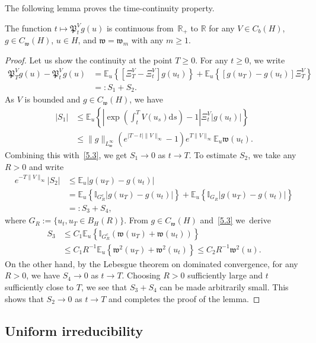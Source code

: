\documentclass[AHL,Unicode,longabstracts]{cedram}
\newcommand{\R}{{\mathbb R}}
\newcommand{\I}{{\mathbb I}}
\newcommand{\E}{{\mathbb E}}
\newcommand{\ty}{\infty}
\newcommand{\wwww}{{\mathfrak w}}
\newcommand{\PPPP}{{\mathfrak P}}
\newcommand{\dd}{\mathrm{d}}
\begin{document}
The following lemma proves the time-continuity property.

\begin{lemm}
The function $t\mapsto\PPPP^V_tg(u) $ is continuous from~$\R_+$ to $\R$ for any $V\in C_b(H)$, $ g\in C_\wwww(H) $, $u\in H$, and $\wwww=\wwww_m$ with any $m\ge1$.
\end{lemm}

\begin{proof}
Let us show the continuity at the point $T\ge0$.
For any $t\ge0$, we write
\begin{align*}
\PPPP^V_Tg(u)-\PPPP^V_tg(u)&=\E_u \left\{\left[\Xi^V_T-\Xi^V_t \right] g(u_t)\right\}+ \E_u\left\{\left[g(u_T)- g(u_t) \right] \Xi^V_T\right\}\nonumber\\&=: S_1+S_2.
\end{align*}
As $V$ is bounded and $ g\in C_\wwww(H) $, we have
\begin{align*}
|S_1|&\le \E_u \left\{\left|\exp\left(\int_t^TV(u_s)\dd s\right)- 1 \right| \Xi^V_t|g(u_t)|\right\}\nonumber\\&\le \|g\|_{L^\ty_\wwww} \left(e^{|T-t|\|V\|_\infty}-1\right)e^{T\|V\|_\infty} \E_u \wwww(u_t).
\end{align*}
Combining this with~\eqref{5.3}, we get $S_1\to0$ as $t\to T$. To estimate $S_2$, we take any~$R>0$ and write
\begin{align*}
e^{-T\|V\|_\infty} | S_2|&\le \E_u \left| g(u_T)- g(u_t) \right| \\&= \E_u \left\{\I_{G_R^c} \left| g(u_T)- g(u_t) \right| \right\}+ \E_u \left\{\I_{G_R} \left| g(u_T)- g(u_t) \right| \right\}\\&=: S_3+S_4,
\end{align*}
where $G_R:=\{u_t, u_T\in B_H(R)\}$. From $ g\in C_\wwww(H) $ and~\eqref{5.3} we~derive
\begin{align*}
S_3 &\le C_1 \E_u \left\{\I_{G_R^c} (\wwww(u_T)+ \wwww(u_t)) \right\} \\&\le C_1 R^{-1} \E_u \left\{ \wwww^2(u_T)+ \wwww^2(u_t) \right\} \le C_2 R^{-1} \wwww^2(u).
\end{align*}
On the other hand, by the Lebesgue theorem on dominated convergence, for any $R>0$, we have $S_4 \to 0$ as $t\to T$. Choosing $R>0$ sufficiently large and $t$ sufficiently close to $T$, we see that $S_3+S_4$ can be made arbitrarily small. This shows that $S_2\to0$ as $t\to T$ and completes the proof of the lemma.
\end{proof}

\subsection{Uniform irreducibility}\label{S:2.3}
\end{document}
